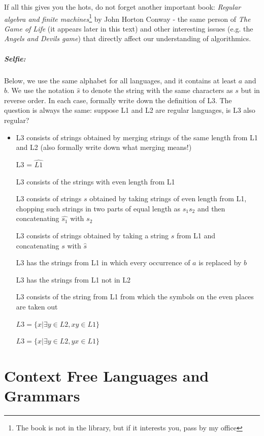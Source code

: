 If all this gives you the hots, do not forget another important
book: {\em Regular algebra and finite machines}\footnote{The book is
  not in the library, but if it interests you, pass by my office} by
John Horton Conway - the same person of {\em The Game of Life} (it
appears later in this text) and other interesting issues (e.g. the
{\em Angels and Devils game}) that directly affect our understanding
of algorithmics.

\clearpage

\paragraph{Selfie:}
Below, we use the same alphabet for all languages, and it contains at
least $a$ and $b$.  We use the notation $\hat{s}$ to denote the string
with the same characters as $s$ but in reverse order. In each case,
formally write down the definition of L3. The question is always the
same: suppose L1 and L2 are regular languages, is L3 also regular?
\begin{itemize}
\item[]
L3 consists of strings obtained by merging strings of the same length
from L1 and L2 (also formally write down what merging means!)

L3 = $\widehat{L1}$

L3 consists of the strings with even length from L1

L3 consists of strings $s$ obtained by taking strings of even length
from L1, chopping such strings in two parts of equal length
as $s_1s_2$ and then concatenating $\widehat{s_1}$ with $s_2$

L3 consists of strings obtained by taking a string $s$ from L1 and
concatenating $s$ with $\hat{s}$

L3 has the strings from L1 in which every occurrence of $a$ is
replaced by $b$

L3 has the strings from L1 not in L2

L3 consists of the string from L1 from which the symbols on the even
places are taken out

$L3 = \{x|\exists y \in L2, xy \in L1\}$

$L3 = \{x|\exists y \in L2, yx \in L1\}$

\end{itemize}



\chapter{Context Free Languages and Grammars}\label{contextvrijelanguages}

